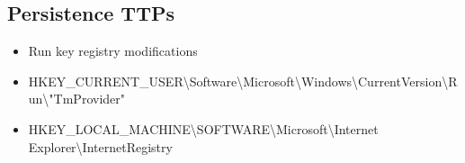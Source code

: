 \documentclass[12pt,letterpaper]{article}
\begin{document}
\subsection{Persistence TTPs}
\begin{itemize}
    \item Run key registry modifications
    \item HKEY\_CURRENT\_USER\textbackslash{}Software\textbackslash{}Microsoft\textbackslash{}Windows\textbackslash{}CurrentVersion\textbackslash{}Run\textbackslash{}"TmProvider"
    \item HKEY\_LOCAL\_MACHINE\textbackslash{}SOFTWARE\textbackslash{}Microsoft\textbackslash{}Internet Explorer\textbackslash{}InternetRegistry
\end{itemize}
\end{document}
